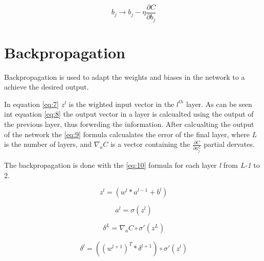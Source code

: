 \begin{equation} \label{eq:5}
\ b_{j} \rightarrow b_{j} - \eta\frac{\partial C}{\partial b_{j}} 
\end{equation}


\section{Backpropagation}\label{sec:INTRO:backprop}

Backpropagation is used to adapt the weights and biases in the network to a achieve the desired output. 

In equation \ref{eq:7} $z^l$ is the wighted input vector in the $l^{th}$ layer. As can be seen int equation \ref{eq:8} the output vector in a layer is calcualted using the output of the previous layer, thus forwrding the information. After calcualting the output of the network the \ref{eq:9} formula calcualates the error of the final layer, where \textit{L} is the number of layers, and \textit{$\nabla_aC$} is a vector containing the $\frac{\partial C}{\partial a_j^L}$ partial dervates.

The backpropagation is done with the \ref{eq:10} formula for each layer \textit{l} from \textit{L-1} to 2.

\begin{equation} \label{eq:7}
\ z^l = (w^l*a^{l-1} + b^l) 
\end{equation}

\begin{equation} \label{eq:8}
\ a^l = \sigma(z^l) 
\end{equation}

\begin{equation} \label{eq:9}
\ \delta^L = \nabla_aC \circ \sigma'(z^L)
\end{equation}

\begin{equation} \label{eq:10}
\ \delta^l = ((w^{l+1})^T* \delta^{l+1}) \circ \sigma'(z^l)
\end{equation}